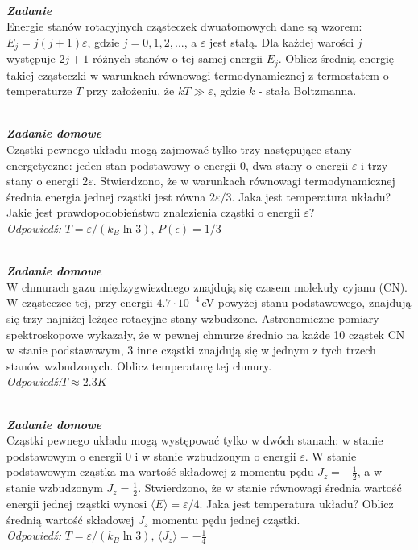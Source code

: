 \documentclass[11pt,a4paper]{article}
\newcounter{zadanie}\newcommand{\zadanie}[1][]{\addtocounter{zadanie}{1} ~\\  {\bf \emph{Zadanie \arabic{zadanie} #1 }} \\}
\newcounter{zaddom}\newcommand{\zaddom}[1][]{\addtocounter{zaddom}{1} ~\\  {\bf \emph{Zadanie domowe \arabic{zaddom} #1 }} \\}
\begin{document}
\zadanie
Energie stanów rotacyjnych cząsteczek dwuatomowych dane są wzorem: $E_j = j(j+1)\varepsilon$,
gdzie $j=0,1,2,...$, a $\varepsilon$ jest stałą. 
Dla każdej warości $j$  występuje $2j+1$ różnych stanów o tej samej energii $E_j$. 
Oblicz średnią energię takiej cząsteczki w warunkach równowagi termodynamicznej 
z termostatem o temperaturze $T$ przy założeniu, że $kT \gg \varepsilon$, gdzie $k$ - stała Boltzmanna.


%
%

\zaddom
Cząstki pewnego układu mogą zajmować tylko trzy następujące stany energetyczne:\linebreak
jeden stan podstawowy o energii 0, dwa stany o energii $\varepsilon$
 i trzy stany o energii $2\varepsilon$. Stwierdzono, że
w warunkach równowagi termodynamicznej średnia energia jednej cząstki
jest równa $2\varepsilon/3$.
Jaka jest temperatura układu?
Jakie jest prawdopodobieństwo znalezienia cząstki o energii $\varepsilon$?
\\
\textit{Odpowiedź:} $T=\varepsilon/(k_B  \ln 3), \, P(\epsilon)=1/3$

\zaddom
W chmurach gazu międzygwiezdnego znajdują się czasem molekuły cyjanu (CN). W cząsteczce
tej, przy energii $4.7 \cdot 10^{-4}$\,eV powyżej stanu podstawowego, znajdują się trzy najniżej leżące
rotacyjne stany wzbudzone. Astronomiczne pomiary spektroskopowe wykazały, że w pewnej
chmurze średnio na każde 10 cząstek CN w stanie podstawowym, 3 inne cząstki znajdują się w
jednym z tych trzech stanów wzbudzonych. Oblicz temperaturę tej chmury.
\\
\textit{Odpowiedź:}$T\approx 2.3 K$

\zaddom
Cząstki pewnego układu mogą występować tylko w dwóch stanach:
w stanie podstawowym o energii 0 i w stanie wzbudzonym o energii $\varepsilon$.
W stanie podstawowym cząstka ma wartość składowej z momentu pędu $J_z=-\frac{1}{2}$, a w stanie wzbudzonym $J_z=\frac{1}{2}$.
Stwierdzono, że w stanie równowagi średnia wartość energii jednej cząstki wynosi $\langle E\rangle = \varepsilon/4$. Jaka jest temperatura układu?
Oblicz średnią wartość składowej $J_z$ momentu pędu jednej cząstki.
\\
\textit{Odpowiedź:} $T=\varepsilon/(k_B \ln 3), \, \langle J_z \rangle = -\frac{1}{4}$
\end{document}
